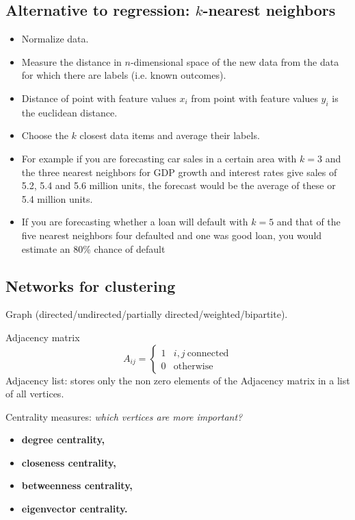 \subsection{Alternative to regression: $k$-nearest neighbors}

\begin{itemize}
    \item Normalize data.
    \item Measure the distance in $n$-dimensional space of the new data from the data for which there are labels (i.e. known outcomes).
    \item Distance of point with feature values $x_{i}$ from point with feature values $y_{i}$ is the euclidean distance.
    \item Choose the $k$ closest data items and average their labels.
    \item For example if you are forecasting car sales in a certain area with $k=3$ and the three nearest neighbors for GDP growth and interest rates give sales of 5.2, 5.4 and 5.6 million units, the forecast would be the average of these or 5.4 million units.
    \item If you are forecasting whether a loan will default with $k=5$ and that of the five nearest neighbors four defaulted and one was good loan, you would estimate an 80\% chance of default
\end{itemize}

\subsection{Networks for clustering}

Graph (directed/undirected/partially directed/weighted/bipartite).

Adjacency matrix
\begin{equation*}
    A_{ij} =
    \begin{cases}
        1 & i,j\ \text{connected} \\
        0 & \text{otherwise}      
    \end{cases}
\end{equation*}
Adjacency list: stores only the non zero elements of the Adjacency matrix in a list of all vertices.

Centrality measures: \textit{which vertices are more important?}
\begin{itemize}
    \item \textbf{degree centrality,}
    \item \textbf{closeness centrality,}
    \item \textbf{betweenness centrality,}
    \item \textbf{eigenvector centrality.}
\end{itemize}

